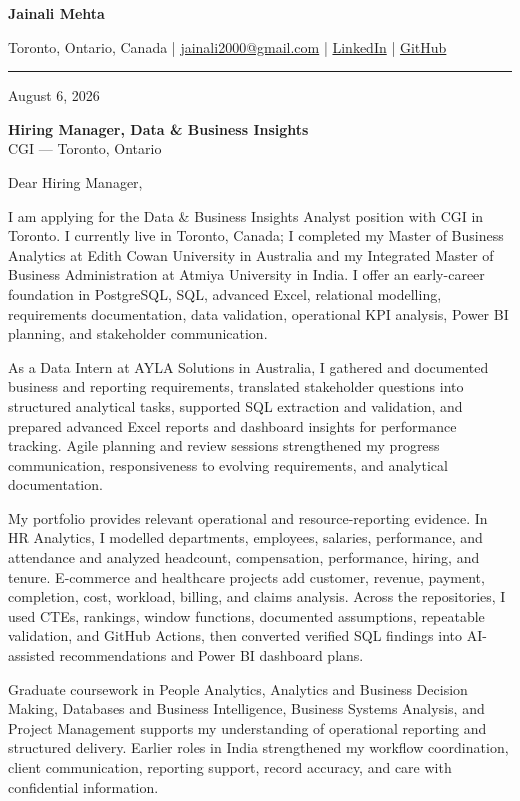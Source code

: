 \documentclass[letterpaper,10pt]{article}
\begin{document}
\begin{center}
  {\fontsize{17}{19}\selectfont\textbf{Jainali Mehta}}\par\vspace{2pt}
  \small Toronto, Ontario, Canada \;|\;
  \href{mailto:jainali2000@gmail.com}{jainali2000@gmail.com} \;|\;
  \href{https://www.linkedin.com/in/jainali-mehta}{LinkedIn} \;|\;
  \href{https://github.com/jainalimehta}{GitHub}
\end{center}
\vspace{-5pt}
\noindent\rule{\textwidth}{0.4pt}

August 6, 2026

\textbf{Hiring Manager, Data \& Business Insights}\\
CGI --- Toronto, Ontario

Dear Hiring Manager,

I am applying for the Data \& Business Insights Analyst position with CGI in Toronto. I currently live in Toronto, Canada; I completed my Master of Business Analytics at Edith Cowan University in Australia and my Integrated Master of Business Administration at Atmiya University in India. I offer an early-career foundation in PostgreSQL, SQL, advanced Excel, relational modelling, requirements documentation, data validation, operational KPI analysis, Power BI planning, and stakeholder communication.

As a Data Intern at AYLA Solutions in Australia, I gathered and documented business and reporting requirements, translated stakeholder questions into structured analytical tasks, supported SQL extraction and validation, and prepared advanced Excel reports and dashboard insights for performance tracking. Agile planning and review sessions strengthened my progress communication, responsiveness to evolving requirements, and analytical documentation.

My portfolio provides relevant operational and resource-reporting evidence. In HR Analytics, I modelled departments, employees, salaries, performance, and attendance and analyzed headcount, compensation, performance, hiring, and tenure. E-commerce and healthcare projects add customer, revenue, payment, completion, cost, workload, billing, and claims analysis. Across the repositories, I used CTEs, rankings, window functions, documented assumptions, repeatable validation, and GitHub Actions, then converted verified SQL findings into AI-assisted recommendations and Power BI dashboard plans.

Graduate coursework in People Analytics, Analytics and Business Decision Making, Databases and Business Intelligence, Business Systems Analysis, and Project Management supports my understanding of operational reporting and structured delivery. Earlier roles in India strengthened my workflow coordination, client communication, reporting support, record accuracy, and care with confidential information.
\end{document}
